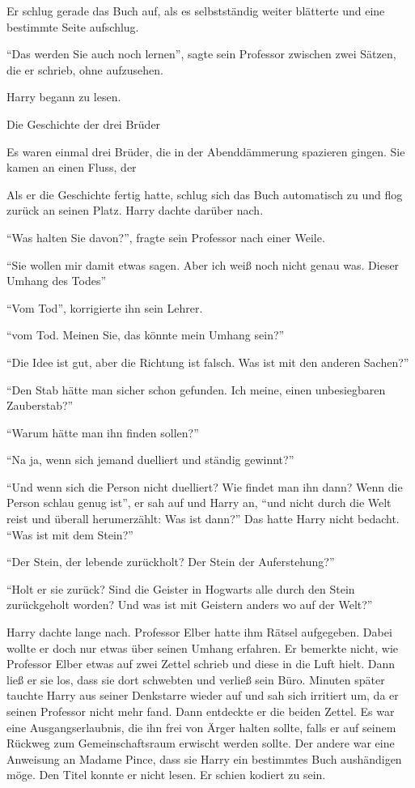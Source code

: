 Er schlug gerade das Buch auf, als es selbstständig weiter blätterte und eine bestimmte Seite aufschlug.

\enquote{Das werden Sie auch noch lernen}, sagte sein Professor zwischen zwei Sätzen, die er schrieb, ohne aufzusehen.

Harry begann zu lesen.

\begin{buch}
Die Geschichte der drei Brüder

Es waren einmal drei Brüder, die in der Abenddämmerung spazieren gingen. Sie kamen an einen Fluss, der\abs
\end{buch}

Als er die Geschichte fertig hatte, schlug sich das Buch automatisch zu und flog zurück an seinen Platz. Harry dachte darüber nach.

\enquote{Was halten Sie davon?}, fragte sein Professor nach einer Weile.

\enquote{Sie wollen mir damit etwas sagen. Aber ich weiß noch nicht genau was. Dieser Umhang des Todes\abs}

\enquote{Vom Tod}, korrigierte ihn sein Lehrer.

\enquote{\aabs vom Tod. Meinen Sie, das könnte mein Umhang sein?}

\enquote{Die Idee ist gut, aber die Richtung ist falsch. Was ist mit den anderen Sachen?}

\enquote{Den Stab hätte man sicher schon gefunden. Ich meine, einen unbesiegbaren Zauberstab?}

\enquote{Warum hätte man ihn finden sollen?}

\enquote{Na ja, wenn sich jemand duelliert und ständig gewinnt?}

\enquote{Und wenn sich die Person nicht duelliert? Wie findet man ihn dann? Wenn die Person schlau genug ist\abs}, er sah auf und Harry an, \enquote{\aabs und nicht durch die Welt reist und überall herumerzählt:  Was ist dann?} Das hatte Harry nicht bedacht. \enquote{Was ist mit dem Stein?}

\enquote{Der Stein, der lebende zurückholt? Der Stein der Auferstehung?}

\enquote{Holt er sie zurück?  Sind die Geister in Hogwarts alle durch den Stein zurückgeholt worden? Und was ist mit Geistern anders wo auf der Welt?}

Harry dachte lange nach. Professor Elber hatte ihm Rätsel aufgegeben. Dabei wollte er doch nur etwas über seinen Umhang erfahren. Er bemerkte nicht, wie Professor Elber etwas auf zwei Zettel schrieb und diese in die Luft hielt. Dann ließ er sie los, dass sie dort schwebten und verließ sein Büro. Minuten später tauchte Harry aus seiner Denkstarre wieder auf und sah sich irritiert um, da er seinen Professor nicht mehr fand. Dann entdeckte er die beiden Zettel. Es war eine Ausgangserlaubnis, die ihn frei von Ärger halten sollte, falls er auf seinem Rückweg zum Gemeinschaftsraum erwischt werden sollte. Der andere war eine Anweisung an Madame Pince, dass sie Harry ein bestimmtes Buch aushändigen möge. Den Titel konnte er nicht lesen. Er schien kodiert zu sein.

